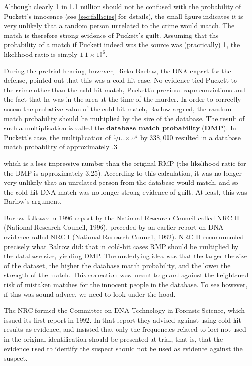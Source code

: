 \documentclass[10pt,dvipsnames,enabledeprecatedfontcommands]{scrartcl}
\begin{document}
Although clearly 1 in 1.1 million should not be confused with the
probability of Puckett's innocence (see \ref{sec:fallacies} for
details), the small figure indicates it is
very unlikely that a random person unrelated to the crime would match.
The match is therefore strong evidence of Puckett's guilt. Assuming that
the probability of a match if Puckett indeed was the source was
(practically) 1, the likelihood ratio is simply \(1.1 \times 10^6\).

During the pretrial hearing, however, Bicka Barlow, the DNA expert for
the defense, pointed out that this was a cold-hit case. No evidence tied
Puckett to the crime other than the cold-hit match, Puckett's previous
rape convictions and the fact that he was in the area at the time of the
murder. In order to correctly assess the probative value of the cold-hit
match, Barlow argued, the random match probability should be multiplied
by the size of the database. The result of such a multiplication is
called the \textbf{database match probability} (\textbf{DMP}). In
Puckett's case, the multiplication of \(\nicefrac{1}{1.1\times 10^6}\)
by \(338,000\) resulted in a database match probability of approximately
.3.

\noindent which is a less impressive number than the original RMP (the
likelihood ratio for the DMP is approximately 3.25). According to this
calculation, it was no longer very unlikely that an unrelated person
from the database would match, and so the cold-hit DNA match was no
longer strong evidence of guilt. At least, this was Barlow's argument.

Barlow followed a 1996 report by the National Research Council called
NRC II (National Research Council, 1996), preceded by an earlier report
on DNA evidence called NRC I (National Research Council, 1992). NRC II
recommended precisely what Balrow did: that in cold-hit cases RMP should
be multiplied by the database size, yielding DMP. The underlying idea
was that the larger the size of the dataset, the higher the database
match probability, and the lower the strength of the match. This
correction was meant to guard against the heightened risk of mistaken
matches for the innocent people in the database. To see however, if this
was sound advice, we need to look under the hood.

The NRC formed the Committee on DNA Technology in Forensic Science,
which issued its first report in 1992. In that report they advised
against using cold hit results as evidence, and insisted that only the
frequencies related to loci not used in the original identification
should be presented at trial, that is, that the evidence used to
identify the suspect should not be used as evidence against the suspect.
\end{document}
